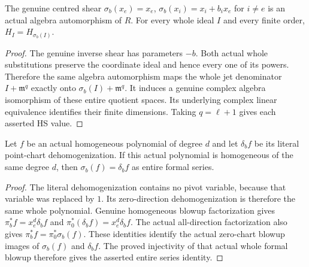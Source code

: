 \begin{theorem}
\label{hir:actual-centred-shear-whole-hs-invariance}
\leanok
The genuine centred shear $\sigma_b(x_e)=x_e$,
$\sigma_b(x_i)=x_i+b_ix_e$ for $i\ne e$ is an actual algebra
automorphism of $R$. For every whole ideal $I$ and every finite
order, $H_I=H_{\sigma_b(I)}$.
\end{theorem}
\begin{proof}
The genuine inverse shear has parameters $-b$. Both actual whole
substitutions preserve the coordinate ideal and hence every one of
its powers. Therefore the same algebra automorphism maps the whole
jet denominator $I+\mathfrak m^q$ exactly onto
$\sigma_b(I)+\mathfrak m^q$. It induces a genuine complex algebra
isomorphism of these entire quotient spaces. Its underlying complex
linear equivalence identifies their finite dimensions. Taking
$q=\ell+1$ gives each asserted HS value.
\end{proof}

\begin{theorem}
\label{hir:actual-point-homogeneous-dehom-shear-identity}
\leanok
Let $f$ be an actual homogeneous polynomial of degree $d$ and let
$\delta_bf$ be its literal point-chart dehomogenization. If this
actual polynomial is homogeneous of the same degree $d$, then
$\sigma_b(f)=\delta_bf$ as entire formal series.
\end{theorem}
\begin{proof}
The literal dehomogenization contains no pivot variable, because
that variable was replaced by $1$. Its zero-direction
dehomogenization is therefore the same whole polynomial. Genuine
homogeneous blowup factorization gives
$\pi_b^*f=x_e^d\delta_bf$ and
$\pi_0^*(\delta_bf)=x_e^d\delta_bf$. The actual all-direction
factorization also gives
$\pi_b^*f=\pi_0^*\sigma_b(f)$. These identities identify the actual
zero-chart blowup images of $\sigma_b(f)$ and $\delta_bf$.
The proved injectivity of that actual whole formal blowup therefore
gives the asserted entire series identity.
\end{proof}

